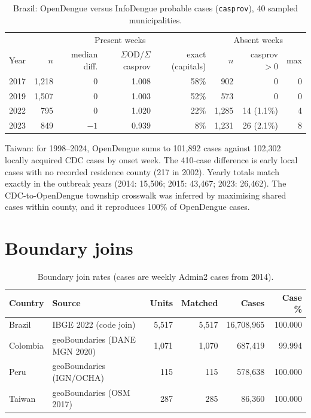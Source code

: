 \documentclass[11pt]{article}
\begin{document}
\begin{table}[h]
\centering\small
\caption{Brazil: OpenDengue versus InfoDengue probable cases (\texttt{casprov}), 40 sampled
municipalities.}
\begin{tabular}{lrrrr|rrr}
\toprule
& \multicolumn{4}{c|}{Present weeks} & \multicolumn{3}{c}{Absent weeks} \\
Year & $n$ & median diff. & $\Sigma$OD/$\Sigma$casprov & exact (capitals) & $n$ & casprov$>0$ & max \\
\midrule
2017 & 1{,}218 & 0 & 1.008 & 58\% & 902 & 0 & 0 \\
2019 & 1{,}507 & 0 & 1.003 & 52\% & 573 & 0 & 0 \\
2022 & 795 & 0 & 1.020 & 22\% & 1{,}285 & 14 (1.1\%) & 4 \\
2023 & 849 & $-1$ & 0.939 & 8\% & 1{,}231 & 26 (2.1\%) & 8 \\
\bottomrule
\end{tabular}
\end{table}

Taiwan: for 1998--2024, OpenDengue sums to 101{,}892 cases against 102{,}302 locally acquired CDC cases by onset week.
The 410-case difference is early local cases with no recorded residence county (217 in 2002). Yearly totals match
exactly in the outbreak years (2014: 15{,}506; 2015: 43{,}467; 2023: 26{,}462). The CDC-to-OpenDengue township
crosswalk was inferred by maximising shared cases within county, and it reproduces 100\% of OpenDengue cases.

\section{Boundary joins}
\label{app:boundaries}

\begin{table}[h]
\centering\small
\caption{Boundary join rates (cases are weekly Admin2 cases from 2014).}
\begin{tabular}{llrrrr}
\toprule
Country & Source & Units & Matched & Cases & Case \% \\
\midrule
Brazil & IBGE 2022 (code join) & 5{,}517 & 5{,}517 & 16{,}708{,}965 & 100.000 \\
Colombia & geoBoundaries (DANE MGN 2020) & 1{,}071 & 1{,}070 & 687{,}419 & 99.994 \\
Peru & geoBoundaries (IGN/OCHA) & 115 & 115 & 578{,}638 & 100.000 \\
Taiwan & geoBoundaries (OSM 2017) & 287 & 285 & 86{,}360 & 100.000 \\
\bottomrule
\end{tabular}
\end{table}
\end{document}

